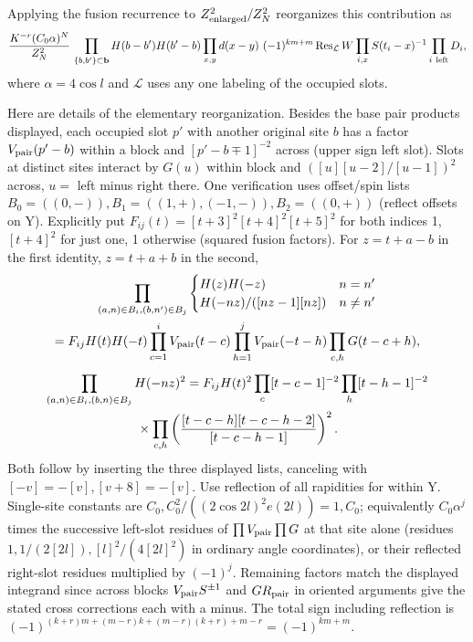 Applying the fusion recurrence to \(Z_{\rm enlarged}^2/Z_N^2\) reorganizes this contribution as
\[
 \frac{K^{-r} (C_0\alpha)^N}{Z_N^2}\,
 \prod_{\{b,b'\}\subset\mathbf b}H(b-b')H(b'-b)\prod_{x,y}d(x-y)
 \ (-1)^{km+m}\operatorname{Res}_{\mathcal L}
 W\prod_{i,x}S(t_i-x)^{-1}\prod_{i\ {\rm left}}D_i ,
\]
where $\alpha=4\cos l$ and \(\mathcal L\) uses any one labeling of the occupied slots.

Here are details of the elementary reorganization. Besides the base pair products displayed, each occupied slot \(p'\) with another original site \(b\) has a factor \(V_{\rm pair}(p'-b)\) within a block and \([p'-b\mp1]^{-2}\) across (upper sign left slot). Slots at distinct sites interact by \(G(u)\) within block and \(([u][u-2]/[u-1])^2\) across, \(u=\) left minus right there. One verification uses offset/spin lists
\(B_0=((0,-)), B_1=((1,+),(-1,-)), B_2=((0,+))\) (reflect offsets on Y). Explicitly put \(F_{ij}(t)=[t+3]^2[t+4]^2[t+5]^2\) for both indices 1, \([t+4]^2\) for just one, 1 otherwise (squared fusion factors). For \(z=t+a-b\) in the first identity, \(z=t+a+b\) in the second,
\[
\begin{gathered}
 \prod_{(a,n)\in B_i,(b,n')\in B_j}
 \begin{cases}H(z)H(-z)&n=n'\\H(-nz)/([nz-1][nz])&n\ne n'\end{cases}\\
 =F_{ij} H(t)H(-t)\prod_{c=1}^i V_{\rm pair}(t-c)\prod_{h=1}^j V_{\rm pair}(-t-h)\prod_{c,h}G(t-c+h),\\[4pt]
 \prod_{(a,n)\in B_i,(b,n)\in B_j} H(-nz)^2
 =F_{ij} H(t)^2\prod_c[t-c-1]^{-2}\prod_h[t-h-1]^{-2}\\
 {}\times\prod_{c,h}\left(\frac{[t-c-h][t-c-h-2]}{[t-c-h-1]}\right)^2 .
\end{gathered}
\]
Both follow by inserting the three displayed lists, canceling with \([-v]=-[v], [v+8]=-[v]\). Use reflection of all rapidities for within Y. Single-site constants are \(C_0, C_0^2/((2\cos 2l)^2 e(2l))=1,C_0\); equivalently \(C_0\alpha^j\) times the successive left-slot residues of \(\prod V_{\rm pair}\prod G\) at that site alone (residues \(1,1/(2[2l]),[l]^2/(4[2l]^2)\) in ordinary angle coordinates), or their reflected right-slot residues multiplied by \((-1)^j\). Remaining factors match the displayed integrand since across blocks \(V_{\rm pair}S^{\pm1}\) and \(G R_{\rm pair}\) in oriented arguments give the stated cross corrections each with a minus. The total sign including reflection is \((-1)^{(k+r)m+(m-r)k+(m-r)(k+r)+m-r}=(-1)^{km+m}\).

